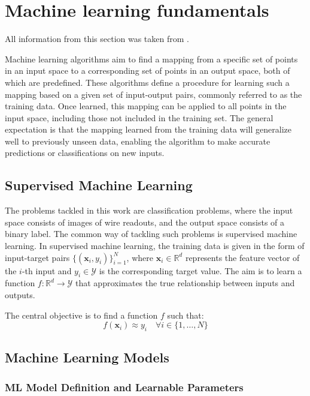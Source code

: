 \documentclass{pracalicmgr}
\begin{document}
\chapter{Machine learning fundamentals}

All information from this section was taken from \cite{MlBasics}.

Machine learning algorithms aim to find a mapping from a specific set of points in an input space to a corresponding set of points in an output space, both of which are predefined. These algorithms define a procedure for learning such a mapping based on a given set of input-output pairs, commonly referred to as the training data. Once learned, this mapping can be applied to all points in the input space, including those not included in the training set. The general expectation is that the mapping learned from the training data will generalize well to previously unseen data, enabling the algorithm to make accurate predictions or classifications on new inputs.

\section{Supervised Machine Learning}

The problems tackled in this work are classification problems, where the input space consists of images of wire readouts, and the output space consists of a binary label. The common way of tackling such problems is supervised machine learning.
In supervised machine learning, the training data is given in the form of input-target pairs \( \{(\mathbf{x}_i, y_i)\}_{i=1}^N \), where \( \mathbf{x}_i \in \mathbb{R}^d \) represents the feature vector of the \( i \)-th input and \( y_i \in \mathcal{Y} \) is the corresponding target value. The aim is to learn a function \( f: \mathbb{R}^d \rightarrow \mathcal{Y} \) that approximates the true relationship between inputs and outputs.

The central objective is to find a function \( f \) such that:
\[
f(\mathbf{x}_i) \approx y_i \quad \forall i \in \{1, \dots, N\}
\]

\section{Machine Learning Models}

\subsection{ML Model Definition and Learnable Parameters}
\end{document}
